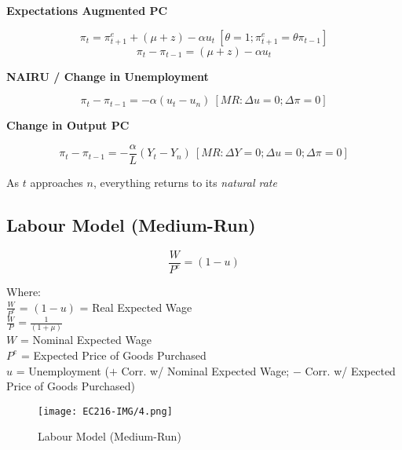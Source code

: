 \documentclass[11pt, english]{article}
\begin{document}
	\textbf{Expectations Augmented PC}

	$$\pi_t=\pi_{t+1}^e+(\mu+z)-\alpha u_t\ [\theta=1;\pi_{t+1}^e=\theta\pi_{t-1}]$$
	$$\pi_t-\pi_{t-1}=(\mu+z)-\alpha u_t$$

	\textbf{NAIRU / Change in Unemployment}

	$$\pi_t-\pi_{t-1}=-\alpha(u_t-u_n)\ [MR:\Delta u=0;\Delta\pi=0]$$

	\textbf{Change in Output PC}

	$$\pi_t-\pi_{t-1}=-\frac{\alpha}{L}(Y_t-Y_n)\ [MR:\Delta Y=0;\Delta u=0;\Delta\pi=0]$$

	As $t$ approaches $n$, everything returns to its \textit{natural rate}

	\newpage

	\subsection{Labour Model (Medium-Run)}

	$$\frac{W}{P^e}=(1-u)$$

        Where:\\
	$\frac{W}{P^e}$ = $(1-u)$ = Real Expected Wage\\
	$\frac{W}{P}=\frac{1}{(1+\mu)}$\\
        $W$ = Nominal Expected Wage\\
        $P^e$ = Expected Price of Goods Purchased\\
        $u$ = Unemployment ($+$ Corr. w/ Nominal Expected Wage; $-$ Corr. w/ Expected Price of Goods Purchased)

	\begin{figure}[H]                                                                           \begin{center}                                                                                      \texttt{[image: EC216-IMG/4.png]}                        \end{center}                                                                                        \caption{Labour Model (Medium-Run)}
        \end{figure}
\end{document}
